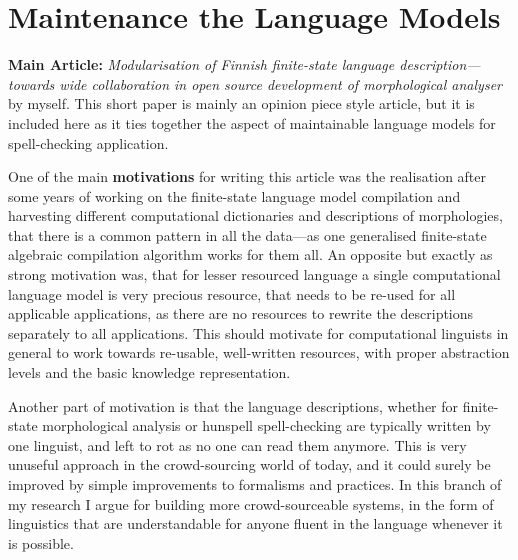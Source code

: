 \documentclass[officiallayout]{unihelcompling}
\begin{document}
\section{Maintenance the Language Models}
\label{sec:maintenance}

\textbf{Main Article:} \emph{Modularisation of Finnish finite-state language 
description—towards wide collaboration in open source development of
morphological analyser} by myself. This short paper is mainly an opinion
piece style article, but it is included here as it ties together the
aspect of maintainable language models for spell-checking application.

One of the main \textbf{motivations} for writing this article was the
realisation after some years of working on the finite-state language model
compilation and harvesting different computational dictionaries and
descriptions of morphologies, that there is a common pattern in all the 
data---as one generalised finite-state algebraic compilation algorithm works
for them all. An opposite but exactly as strong motivation was, that for
lesser resourced language a single computational language model is very
precious resource, that needs to be re-used for all applicable applications,
as there are no resources to rewrite the descriptions separately to all 
applications. This should motivate for computational linguists in general to
work towards re-usable, well-written resources, with proper abstraction levels
and the basic knowledge representation.

Another part of motivation is that the language descriptions, whether for
finite-state morphological analysis or hunspell spell-checking are typically
written by one linguist, and left to rot as no one can read them anymore.
This is very unuseful approach in the crowd-sourcing world of today, and it
could surely be improved by simple improvements to formalisms and practices.
In this branch of my research I argue for building more crowd-sourceable 
systems, in the form of linguistics that are understandable for anyone
fluent in the language whenever it is possible.
\end{document}
